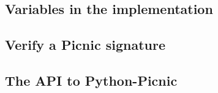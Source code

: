 \documentclass[]{article}
\begin{document}
\subsection{Variables in the implementation}
\subsection{Verify a Picnic signature}
\subsection{The API to Python-Picnic}
%
%
\end{document}
